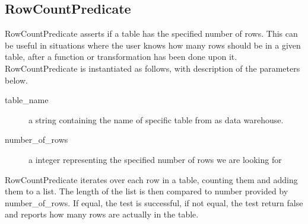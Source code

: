 \subsection{RowCountPredicate}
RowCountPredicate asserts if a table has the specified number of rows. This can be useful in situations where the user knows how many rows should be in a given table, after a function or transformation has been done upon it. RowCountPredicate is instantiated as follows, with description of the parameters below.


\begin{description}
\item [table\_name] a string containing the name of specific table from as data warehouse. 
\item [number\_of\_rows] a integer representing the specified number of rows we are looking for
\end{description}

RowCountPredicate iterates over each row in a table, counting them and adding them to a list. The length of the list is then compared to number provided by number\_of\_rows. If equal, the test is successful, if not equal, the test return false and reports how many rows are actually in the table.

